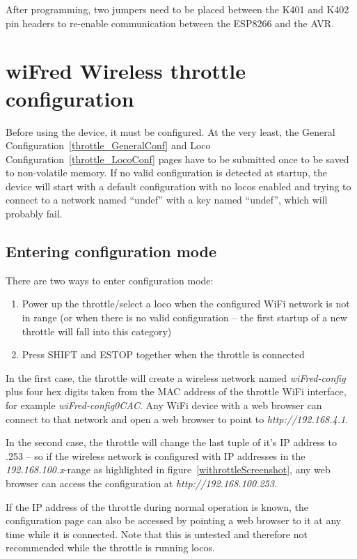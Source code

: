 \documentclass[11pt,a4paper]{scrartcl}
\begin{document}
After programming, two jumpers need to be placed between the K401 and K402 pin headers to re-enable communication between the ESP8266 and the AVR.

\clearpage

\section{wiFred Wireless throttle configuration} \label{config}

Before using the device, it must be configured. At the very least, the General Configuration~\ref{throttle_GeneralConf} and Loco Configuration~\ref{throttle_LocoConf} pages have to be submitted once to be saved to non-volatile memory. If no valid configuration is detected at startup, the device will start with a default configuration with no locos enabled and trying to connect to a network named ``undef'' with a key named ``undef'', which will probably fail.

\subsection{Entering configuration mode}

There are two ways to enter configuration mode:

\begin{enumerate}
\item Power up the throttle/select a loco when the configured WiFi network is not in range (or when there is no valid configuration -- the first startup of a new throttle will fall into this category)
\item Press SHIFT and ESTOP together when the throttle is connected
\end{enumerate}

In the first case, the throttle will create a wireless network named \textit{wiFred-config} plus four hex digits taken from the MAC address of the throttle WiFi interface, for example \textit{wiFred-config0CAC}. Any WiFi device with a web browser can connect to that network and open a web browser to point to \textit{http://192.168.4.1}.

In the second case, the throttle will change the last tuple of it's IP address to .253 -- so if the wireless network is configured with IP addresses in the \textit{192.168.100.x}-range as highlighted in figure~\ref{withrottleScreenshot}, any web browser can access the configuration at \textit{http://192.168.100.253}.

If the IP address of the throttle during normal operation is known, the configuration page can also be accessed by pointing a web browser to it at any time while it is connected. Note that this is untested and therefore not recommended while the throttle is running locos.
\end{document}
